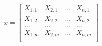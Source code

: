 \documentclass{article}
\begin{document}
 $
x = 
\left[
\begin{array}{c|c|c|c}
X_{1,1} & X_{2,1} & ... & X_{n,1} \\
X_{1,2} & X_{2,2} & ... & X_{n,2} \\
... & ... & ... & ... \\
X_{1,m} & X_{2,m} & ... & X_{n,m} \\
\end{array}
\right]  $
\end{document}
